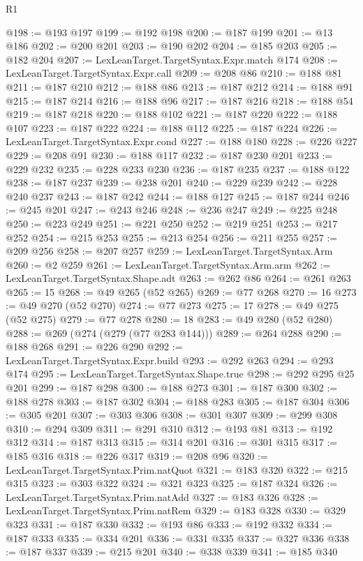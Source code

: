 \begin{lexlean}{R1}
\begin{coremodule}
@198 := @193 @197
@199 := @192 @198
@200 := @187 @199
@201 := @13 @186
@202 := @200 @201
@203 := @190 @202
@204 := @185 @203
@205 := @182 @204
@207 := LexLeanTarget.TargetSyntax.Expr.match @174
@208 := LexLeanTarget.TargetSyntax.Expr.call
@209 := @208 @86
@210 := @188 @81
@211 := @187 @210
@212 := @188 @86
@213 := @187 @212
@214 := @188 @91
@215 := @187 @214
@216 := @188 @96
@217 := @187 @216
@218 := @188 @54
@219 := @187 @218
@220 := @188 @102
@221 := @187 @220
@222 := @188 @107
@223 := @187 @222
@224 := @188 @112
@225 := @187 @224
@226 := LexLeanTarget.TargetSyntax.Expr.cond
@227 := @188 @180
@228 := @226 @227
@229 := @208 @91
@230 := @188 @117
@232 := @187 @230 @201
@233 := @229 @232
@235 := @228 @233 @230
@236 := @187 @235
@237 := @188 @122
@238 := @187 @237
@239 := @238 @201
@240 := @229 @239
@242 := @228 @240 @237
@243 := @187 @242
@244 := @188 @127
@245 := @187 @244
@246 := @245 @201
@247 := @243 @246
@248 := @236 @247
@249 := @225 @248
@250 := @223 @249
@251 := @221 @250
@252 := @219 @251
@253 := @217 @252
@254 := @215 @253
@255 := @213 @254
@256 := @211 @255
@257 := @209 @256
@258 := @207 @257
@259 := LexLeanTarget.TargetSyntax.Arm
@260 := @2 @259
@261 := LexLeanTarget.TargetSyntax.Arm.arm
@262 := LexLeanTarget.TargetSyntax.Shape.adt
@263 := @262 @86
@264 := @261 @263
@265 := 15
@268 := @49 @265 (@52 @265)
@269 := @77 @268
@270 := 16
@273 := @49 @270 (@52 @270)
@274 := @77 @273
@275 := 17
@278 := @49 @275 (@52 @275)
@279 := @77 @278
@280 := 18
@283 := @49 @280 (@52 @280)
@288 := @269 (@274 (@279 (@77 @283 @144)))
@289 := @264 @288
@290 := @188 @268
@291 := @226 @290
@292 := LexLeanTarget.TargetSyntax.Expr.build
@293 := @292 @263
@294 := @293 @174
@295 := LexLeanTarget.TargetSyntax.Shape.true
@298 := @292 @295 @25 @201
@299 := @187 @298
@300 := @188 @273
@301 := @187 @300
@302 := @188 @278
@303 := @187 @302
@304 := @188 @283
@305 := @187 @304
@306 := @305 @201
@307 := @303 @306
@308 := @301 @307
@309 := @299 @308
@310 := @294 @309
@311 := @291 @310
@312 := @193 @81
@313 := @192 @312
@314 := @187 @313
@315 := @314 @201
@316 := @301 @315
@317 := @185 @316
@318 := @226 @317
@319 := @208 @96
@320 := LexLeanTarget.TargetSyntax.Prim.natQuot
@321 := @183 @320
@322 := @215 @315
@323 := @303 @322
@324 := @321 @323
@325 := @187 @324
@326 := LexLeanTarget.TargetSyntax.Prim.natAdd
@327 := @183 @326
@328 := LexLeanTarget.TargetSyntax.Prim.natRem
@329 := @183 @328
@330 := @329 @323
@331 := @187 @330
@332 := @193 @86
@333 := @192 @332
@334 := @187 @333
@335 := @334 @201
@336 := @331 @335
@337 := @327 @336
@338 := @187 @337
@339 := @215 @201
@340 := @338 @339
@341 := @185 @340

\end{coremodule}
\end{lexlean}
